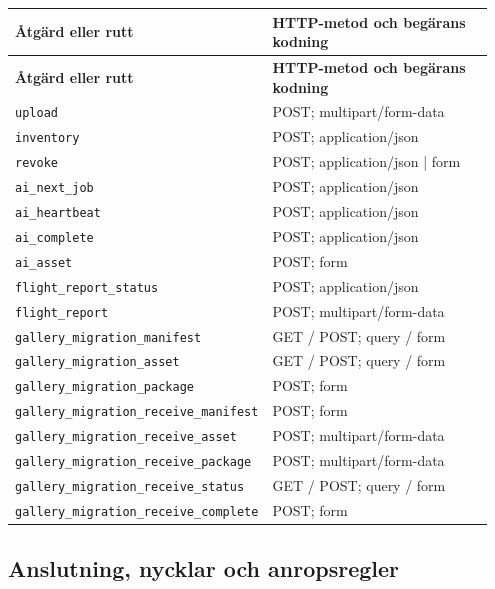 \documentclass[11pt,a4paper]{article}
\newcommand{\codeword}[1]{\nolinkurl{#1}}
\begin{document}
\begin{longtable}{@{}>{\RaggedRight\arraybackslash}p{0.28\linewidth}>{\RaggedRight\arraybackslash}p{0.67\linewidth}@{}}
\toprule
\textbf{Åtgärd eller rutt} & \textbf{HTTP-metod och begärans kodning} \\
\midrule
\endfirsthead
\toprule
\textbf{Åtgärd eller rutt} & \textbf{HTTP-metod och begärans kodning} \\
\midrule
\endhead
\bottomrule
\endfoot
\codeword{upload} & POST; multipart/form-data \\
\codeword{inventory} & POST; application/json \\
\codeword{revoke} & POST; application/json | form \\
\codeword{ai_next_job} & POST; application/json \\
\codeword{ai_heartbeat} & POST; application/json \\
\codeword{ai_complete} & POST; application/json \\
\codeword{ai_asset} & POST; form \\
\codeword{flight_report_status} & POST; application/json \\
\codeword{flight_report} & POST; multipart/form-data \\
\codeword{gallery_migration_manifest} & GET / POST; query / form \\
\codeword{gallery_migration_asset} & GET / POST; query / form \\
\codeword{gallery_migration_package} & POST; form \\
\codeword{gallery_migration_receive_manifest} & POST; form \\
\codeword{gallery_migration_receive_asset} & POST; multipart/form-data \\
\codeword{gallery_migration_receive_package} & POST; multipart/form-data \\
\codeword{gallery_migration_receive_status} & GET / POST; query / form \\
\codeword{gallery_migration_receive_complete} & POST; form \\
\end{longtable}

\subsection{\texorpdfstring{Anslutning, nycklar och anropsregler}{Anslutning, nycklar och anropsregler}}

\label{api352:connection}
\end{document}
